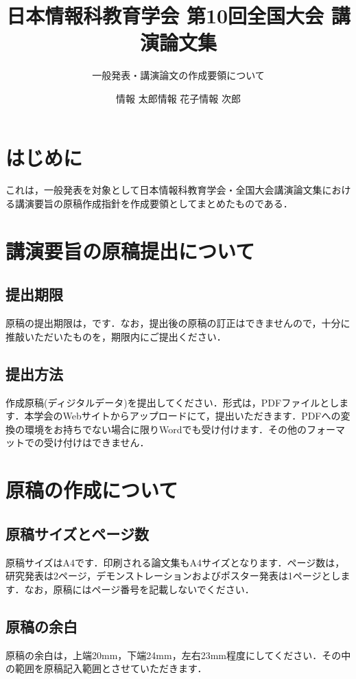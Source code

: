 \documentclass[dvipdfmx]{jaeis-national-convention}
\title{日本情報科教育学会 第10回全国大会 講演論文集}
\subtitle{一般発表・講演論文の作成要領について}
\author{情報 太郎\hspace{3cm}情報 花子\hspace{3cm}情報 次郎}
\affiliation{情報大学教育学部\hspace{2cm}情報大学工学部\hspace{2cm}情報大学大学院大学}
\begin{document}

\maketitle

\section{はじめに}

これは，一般発表を対象として日本情報科教育学会・全国大会講演論文集における講演要旨の原稿作成指針を作成要領としてまとめたものである．

\section{講演要旨の原稿提出について}
\subsection{提出期限}
原稿の提出期限は，です．なお，提出後の原稿の訂正はできませんので，十分に推敲いただいたものを，期限内にご提出ください．

\subsection{提出方法}
作成原稿(ディジタルデータ)を提出してください．形式は，PDFファイルとします．本学会のWebサイトからアップロードにて，提出いただきます．PDFへの変換の環境をお持ちでない場合に限りWordでも受け付けます．その他のフォーマットでの受け付けはできません．

\section{原稿の作成について}
\subsection{原稿サイズとページ数}
原稿サイズはA4です．印刷される論文集もA4サイズとなります．ページ数は，研究発表は2ページ，デモンストレーションおよびポスター発表は1ページとします．なお，原稿にはページ番号を記載しないでください．

\subsection{原稿の余白}
原稿の余白は，上端20mm，下端24mm，左右23mm程度にしてください．その中の範囲を原稿記入範囲とさせていただきます．
\end{document}
